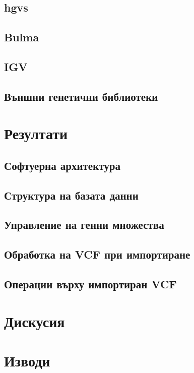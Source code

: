 \documentclass[pdftex,cyrillic,14pt,a4page,twoside]{extreport}
\begin{document}
\paragraph{}
\section{hgvs}
\paragraph{}
\section{Bulma}
\paragraph{}
\section{IGV}
\paragraph{}
\section{Външни генетични библиотеки}
\paragraph{}
\chapter{Резултати}
\section{Софтуерна архитектура}
\section{Структура на базата данни}
\section{Управление на генни множества}
\section{Обработка на VCF при импортиране}
\section{Операции върху импортиран VCF}
\chapter{Дискусия}
\chapter{Изводи}




\end{document}

